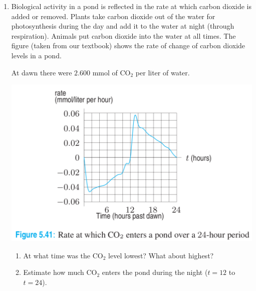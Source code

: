 \documentclass[12pt,letterpaper,noanswers]{exam}
\begin{document}
\begin{enumerate}
   \item Biological activity in a pond is reflected in the rate at which carbon dioxide is added or removed.  Plants take carbon dioxide out of the water for photosynthesis during the day and add it to the water at night (through respiration).  Animals put carbon dioxide into the water at all times.  The figure (taken from our textbook) shows the rate of change of carbon dioxide levels in a pond.  
   
   At dawn there were $2.600$ mmol of CO$_2$ per liter of water.
   
   \includegraphics[scale=0.4]{img/C10pondco2.png}
   
   \begin{enumerate}
       \item At what time was the CO$_2$ level lowest?  What about highest?
       \vspace{1cm}
       
       \item Estimate how much CO$_2$ enters the pond during the night ($t = 12$ to $t = 24$).
      
      \vspace{3cm}
      
   \end{enumerate}
   
\end{enumerate}
\end{document}
